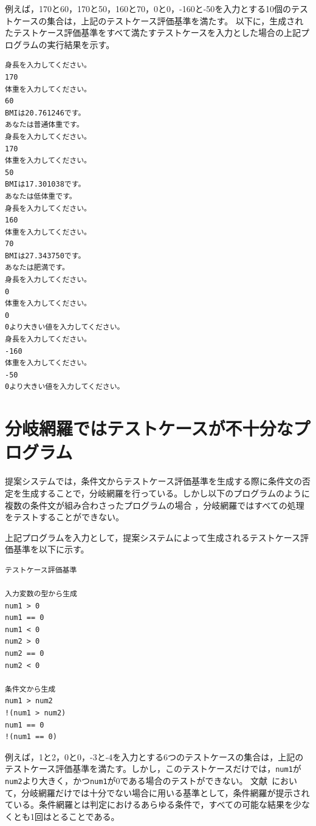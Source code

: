 \documentclass{tpu-sotu}
\begin{document}
例えば，170と60，170と50，160と70，0と0，-160と-50を入力とする10個のテストケースの集合は，上記のテストケース評価基準を満たす。
以下に，生成されたテストケース評価基準をすべて満たすテストケースを入力とした場合の上記プログラムの実行結果を示す。
\begin{lstlisting}[xleftmargin=1cm]
身長を入力してください。
170
体重を入力してください。
60
BMIは20.761246です。
あなたは普通体重です。
身長を入力してください。
170
体重を入力してください。
50
BMIは17.301038です。
あなたは低体重です。
身長を入力してください。
160
体重を入力してください。
70
BMIは27.343750です。
あなたは肥満です。
身長を入力してください。
0
体重を入力してください。
0
0より大きい値を入力してください。
身長を入力してください。
-160
体重を入力してください。
-50
0より大きい値を入力してください。
\end{lstlisting}
\section{分岐網羅ではテストケースが不十分なプログラム}
提案システムでは，条件文からテストケース評価基準を生成する際に条件文の否定を生成することで，分岐網羅を行っている。しかし以下のプログラムのように複数の条件文が組み合わさったプログラムの場合 ，分岐網羅ではすべての処理をテストすることができない。

上記プログラムを入力として，提案システムによって生成されるテストケース評価基準を以下に示す。
\begin{lstlisting}[xleftmargin=1cm]
テストケース評価基準

入力変数の型から生成
num1 > 0
num1 == 0
num1 < 0
num2 > 0
num2 == 0
num2 < 0

条件文から生成
num1 > num2
!(num1 > num2)
num1 == 0
!(num1 == 0)
\end{lstlisting}
例えば，1と2，0と0，-3と-4を入力とする6つのテストケースの集合は，上記のテストケース評価基準を満たす。しかし，このテストケースだけでは，{\tt num1}が{\tt num2}より大きく，かつ{\tt num1}が0である場合のテストができない。
文献~\cite{b3}において，分岐網羅だけでは十分でない場合に用いる基準として，条件網羅が提示されている。条件網羅とは判定におけるあらゆる条件で，すべての可能な結果を少なくとも1回はとることである。
\end{document}
